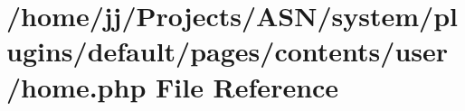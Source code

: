 \hypertarget{system_2plugins_2default_2pages_2contents_2user_2home_8php}{}\section{/home/jj/\+Projects/\+A\+S\+N/system/plugins/default/pages/contents/user/home.php File Reference}
\label{system_2plugins_2default_2pages_2contents_2user_2home_8php}
